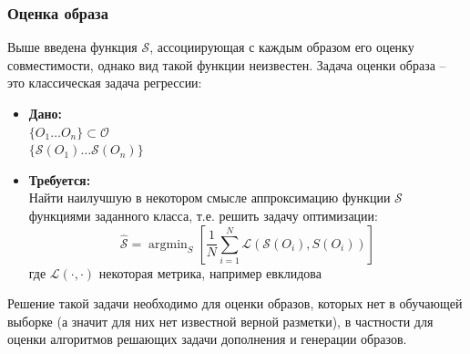 \documentclass[a4paper,14pt]{extarticle}
\DeclareMathOperator*{\argmax}{argmax}
\DeclareMathOperator*{\argmin}{argmin}
\begin{document}
			\subsubsection{Оценка образа}
				Выше введена функция $\mathcal{S}$, ассоциирующая с каждым образом его оценку совместимости, однако вид такой функции неизвестен. Задача оценки образа -- это классическая задача регрессии:
				\begin{itemize}
					\item[] \textbf{Дано:}\\
						$\{O_1\dots O_n\}\subset \mathcal{O}$\\
						$\{\mathcal{S}(O_1)\dots\mathcal{S}(O_n)\}$
					\item[] \textbf{Требуется:}\\
					Найти наилучшую в некотором смысле аппроксимацию функции $\mathcal{S}$ функциями заданного класса, т.е. решить задачу оптимизации:\\
					$$\hat{\mathcal{S}}= \argmin_{S}\left[\frac{1}{N} \sum\limits_{i=1}^N\mathcal{L}(\mathcal{S}(O_i), S(O_i))\right]$$
					где $\mathcal{L}(\cdot, \cdot)$ некоторая метрика, например евклидова
				\end{itemize}
			Решение такой задачи необходимо для оценки образов, которых нет в обучающей выборке (а значит для них нет известной верной разметки), в частности для оценки алгоритмов решающих задачи дополнения и генерации образов.
%			
				
\end{document}
